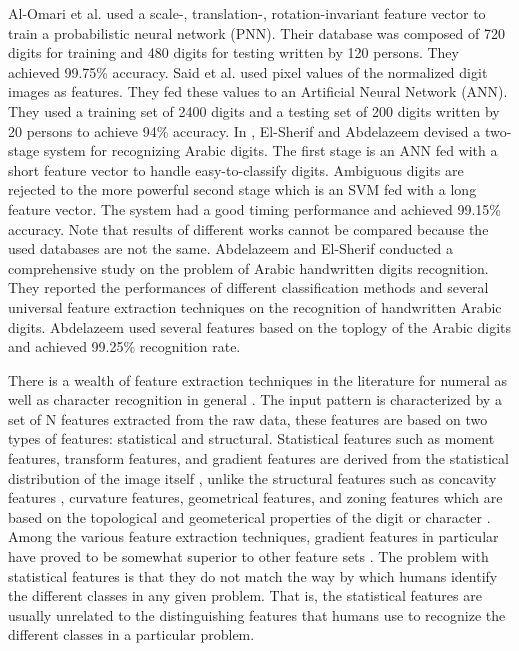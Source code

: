 \documentclass[conference]{IEEEtran}
\begin{document}
Al-Omari et al. \cite{indiannumerals14} used a scale-, translation-, rotation-invariant feature vector to train a probabilistic neural network (PNN). Their database was composed of 720 digits for training and 480 digits for testing written by 120 persons. They achieved 99.75\% accuracy. Said et al.\cite{EnglishArabic15} used pixel values of the normalized digit images as features. They fed these values to an Artificial Neural Network (ANN). They used a training set of 2400 digits and a testing set of 200 digits written by 20 persons to achieve 94\% accuracy. In \cite{ADBase9}, El-Sherif and Abdelazeem devised a two-stage system for recognizing Arabic digits. The first stage is an ANN fed with a short feature vector to handle easy-to-classify digits. Ambiguous digits are rejected to the more powerful second stage which is an SVM fed with a long feature vector. The system had a good timing performance and achieved 99.15\% accuracy. Note that results of different works cannot be compared because the used databases are not the same. Abdelazeem and El-Sherif \cite{IjdarSherifPaper} conducted a comprehensive study on the problem of Arabic handwritten digits recognition. They reported the performances of different classification methods and several universal feature extraction techniques on the recognition of handwritten Arabic digits. Abdelazeem  \cite{Abdelazeem2009} used several features based on the toplogy of the Arabic digits and achieved 99.25\% recognition rate. %


There is a wealth of feature extraction techniques in the literature for numeral as well as character recognition in general \cite{TrierFeature}. The input pattern is characterized by a set of N features extracted from the raw data, these features are based on two types of features: statistical and structural. Statistical features such as moment features, transform features, and gradient features are derived from the statistical distribution of the image itself \cite{benchmarking3,Shiagradient}, unlike the structural features such as concavity features , curvature features, geometrical features, and zoning features which are based on the topological and geometerical properties of the digit or character \cite{SirkantangradientContor,visionfeatures5}. Among the various feature extraction techniques, gradient features in particular have proved to be somewhat superior to other feature sets  \cite{benchmarking3,liunormalizegradient}. The  problem with statistical features is that they do not match the way by which humans identify the different classes in any given problem. That is, the statistical features are usually unrelated to the distinguishing features that humans use to recognize the different classes in a particular problem.
\end{document}
